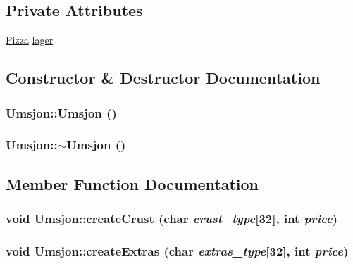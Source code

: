 \subsection*{Private Attributes}
\begin{CompactItemize}
\item 
\hyperlink{class_pizza}{Pizza} \hyperlink{class_umsjon_0f90fe5c344e62852b747ecbdc5b5d90}{lager}
\end{CompactItemize}


\subsection{Constructor \& Destructor Documentation}
\hypertarget{class_umsjon_1f89bef332176cd139fa5f900d4735b6}{
\subsubsection[Umsjon]{\setlength{\rightskip}{0pt plus 5cm}Umsjon::Umsjon ()}}
\label{class_umsjon_1f89bef332176cd139fa5f900d4735b6}


\hypertarget{class_umsjon_0e6a6c83c46b16695a818c39dd4a700a}{
\subsubsection[$\sim$Umsjon]{\setlength{\rightskip}{0pt plus 5cm}Umsjon::$\sim$Umsjon ()}}
\label{class_umsjon_0e6a6c83c46b16695a818c39dd4a700a}




\subsection{Member Function Documentation}
\hypertarget{class_umsjon_75c9c243db5456ca368b8cdc6f617603}{
\subsubsection[createCrust]{\setlength{\rightskip}{0pt plus 5cm}void Umsjon::create\-Crust (char {\em crust\_\-type}\mbox{[}32\mbox{]}, int {\em price})}}
\label{class_umsjon_75c9c243db5456ca368b8cdc6f617603}


\hypertarget{class_umsjon_b3b4384d1b6159cee7aab19dc1ff23eb}{
\subsubsection[createExtras]{\setlength{\rightskip}{0pt plus 5cm}void Umsjon::create\-Extras (char {\em extras\_\-type}\mbox{[}32\mbox{]}, int {\em price})}}
\label{class_umsjon_b3b4384d1b6159cee7aab19dc1ff23eb}


